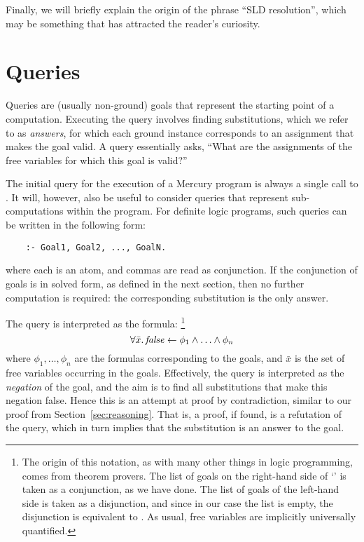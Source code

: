Finally,
we will briefly explain the origin of the phrase ``SLD resolution'',
which may be something that has attracted the reader's curiosity.


\section{Queries}
\label{sec:queries}

Queries are (usually non-ground) goals that represent
the starting point of a computation.
Executing the query involves finding substitutions,
which we refer to as \emph{answers\label{gi:answer}},
for which each ground instance corresponds to
an assignment that makes the goal valid.
A query essentially asks,
``What are the assignments of the free variables
for which this goal is valid?''

The initial query for the
execution of a Mercury program is always
a single call to .
It will, however,
also be useful to consider queries that represent
sub-computations within the program.
For definite logic programs,
such queries can be written in the following form:
\begin{verbatim}
    :- Goal1, Goal2, ..., GoalN.
\end{verbatim}
where each  is an atom,
and commas are read as conjunction.
If the conjunction of goals is in solved form,
as defined in the next section,
then no further computation is required:
the corresponding substitution is the only answer.

The query is interpreted as the formula:%
\footnote{
The origin of this notation,
as with many other things in logic programming,
comes from theorem provers.
The list of goals on the right-hand side of `\co{:-}'
is taken as a conjunction,
as we have done.
The list of goals of the left-hand side
is taken as a disjunction,
and since in our case the list is empty,
the disjunction is equivalent to \false.
As usual, free variables are implicitly universally quantified.
}
\[
    \forall \bar{x}.\,
        \text{\textit{false}} \leftarrow \phi_1 \land \ldots \land \phi_n
\]
where $\phi_1, \ldots, \phi_n$
are the formulas corresponding to the goals,
and $\bar{x}$ is the set of free variables
occurring in the goals.
Effectively,
the query is interpreted as the \emph{negation} of the goal,
and the aim is to find all substitutions
that make this negation false.
Hence this is an attempt at proof by contradiction,
similar to our proof from Section~\ref{sec:reasoning}.
That is, a proof, if found, is a refutation of the query,
which in turn implies that the substitution is an answer to the goal.

